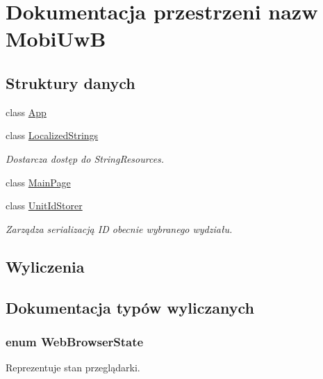 \hypertarget{a00264}{}\section{Dokumentacja przestrzeni nazw Mobi\+Uw\+B}
\label{a00264}
\subsection*{Struktury danych}
\begin{DoxyCompactItemize}
\item 
class \hyperlink{a00005}{App}
\item 
class \hyperlink{a00038}{Localized\+Strings}
\begin{DoxyCompactList}\small\item\em Dostarcza dostęp do String\+Resource\textquotesingle{}s. \end{DoxyCompactList}\item 
class \hyperlink{a00039}{Main\+Page}
\item 
class \hyperlink{a00079}{Unit\+Id\+Storer}
\begin{DoxyCompactList}\small\item\em Zarządza serializacją I\+D obecnie wybranego wydziału. \end{DoxyCompactList}\end{DoxyCompactItemize}
\subsection*{Wyliczenia}


\subsection{Dokumentacja typów wyliczanych}
\hypertarget{a00264_ad9bd655e7beb046ad88400ef805624f9}{}
\subsubsection[{Web\+Browser\+State}]{\setlength{\rightskip}{0pt plus 5cm}enum Web\+Browser\+State\hspace{0.3cm}{\ttfamily [strong]}}\label{a00264_ad9bd655e7beb046ad88400ef805624f9}


Reprezentuje stan przeglądarki. 

